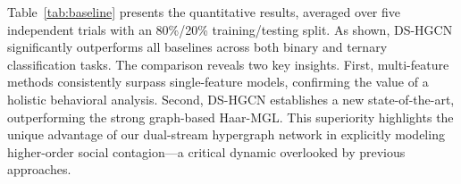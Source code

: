 \documentclass[runningheads]{llncs}
\begin{document}
\begin{table}[t]
	\caption{Comparison with previous state-of-the-art methods on the RoomReader dataset. Entries marked with $^\diamond$ are taken from paper \cite{li2024multimodal}, whereas those with $^\dagger$ come from our re-implementation using open-source codes.}
	
	\centering
	\label{tab:baseline}
\end{table}


Table~\ref{tab:baseline} presents the quantitative results, averaged over five independent trials with an 80\%/20\% training/testing split. As shown, DS-HGCN significantly outperforms all baselines across both binary and ternary classification tasks. The comparison reveals two key insights. First, multi-feature methods consistently surpass single-feature models, confirming the value of a holistic behavioral analysis. Second, DS-HGCN establishes a new state-of-the-art, outperforming the strong graph-based Haar-MGL. This superiority highlights the unique advantage of our dual-stream hypergraph network in explicitly modeling higher-order social contagion—a critical dynamic overlooked by previous approaches.
\end{document}
